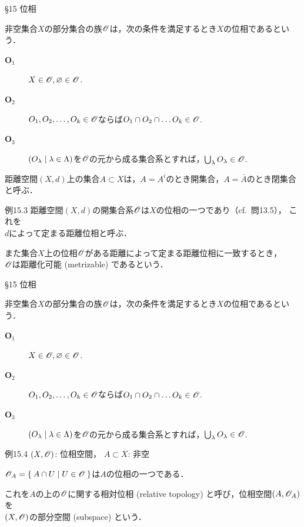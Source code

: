 \documentclass[uplatex,a4paper,dvipdfmx,aspectratio=169,11pt]{beamer}
\begin{document}
\begin{frame}[fragile]{\S 15 位相}
    \begin{block}{}
        非空集合$X$の部分集合の族$\mathscr{O}$は，次の条件を満足するとき$X$の\alert{位相}であるという．
       \begin{description}
           \item[$\textbf{O}_1$] $X \in \mathscr{O}, \varnothing \in \mathscr{O}$.
           \item[$\textbf{O}_2$] $O_1, O_2, \ldots, O_k \in \mathscr{O}$ならば$O_1 \cap O_2 \cap \dots O_k \in \mathscr{O}$.
           \item[$\textbf{O}_3$] $\qty(O_\lambda \mid \lambda \in \Lambda)$を$\mathscr{O}$の元から成る集合系とすれば，$\bigcup_\lambda O_\lambda \in \mathscr{O}$.
       \end{description} 
    \end{block}
    \medskip{}

    距離空間$(X, d)$上の集合$A \subset X$は，$A = A^i$のとき開集合，$A = \overline A$のとき閉集合と呼ぶ．

    \begin{exampleblock}{例15.3}
        距離空間$(X, d)$の開集合系$\mathscr{O}$は$X$の位相の一つであり（cf.\ 問13.5），
        これを\\$d$によって定まる\alert{距離位相}と呼ぶ．
        \medskip{}

        また集合$X$上の位相$\mathscr{O}$がある距離によって定まる距離位相に一致するとき，\\$\mathscr{O}$は\alert{距離化可能} (metrizable) であるという．
    \end{exampleblock}
\end{frame}

\begin{frame}[fragile]{\S 15 位相}
    \begin{block}{}
        非空集合$X$の部分集合の族$\mathscr{O}$は，次の条件を満足するとき$X$の\alert{位相}であるという．
       \begin{description}
           \item[$\textbf{O}_1$] $X \in \mathscr{O}, \varnothing \in \mathscr{O}$.
           \item[$\textbf{O}_2$] $O_1, O_2, \ldots, O_k \in \mathscr{O}$ならば$O_1 \cap O_2 \cap \dots O_k \in \mathscr{O}$.
           \item[$\textbf{O}_3$] $\qty(O_\lambda \mid \lambda \in \Lambda)$を$\mathscr{O}$の元から成る集合系とすれば，$\bigcup_\lambda O_\lambda \in \mathscr{O}$.
       \end{description} 
    \end{block}
    \medskip{}

    \begin{exampleblock}{例15.4}
        $(X, \mathscr{O})$: 位相空間， \quad $A \subset X$: 非空
        \medskip{}

        $\mathscr{O}_A = \Set{A \cap U | U \in \mathscr{O}}$は$A$の位相の一つである．

        これを$A$の上の$\mathscr{O}$に関する\alert{相対位相} (relative topology) と呼び，位相空間$(A, \mathscr{O}_A)$を\\$(X, \mathscr{O})$の\alert{部分空間} (subspace) という．
    \end{exampleblock}
\end{frame}
\end{document}
